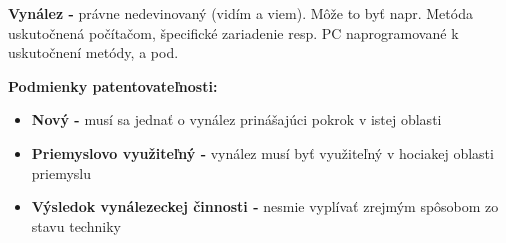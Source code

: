 \textbf{Vynález - } právne nedevinovaný (vidím a viem). Môže to byť napr. Metóda uskutočnená počítačom, špecifické zariadenie resp. PC naprogramované k uskutočnení metódy, a pod. 

\textbf{Podmienky patentovateľnosti:}
\begin{itemize}
    \item \textbf{Nový -} musí sa jednať o vynález prinášajúci pokrok v istej oblasti
    \item \textbf{Priemyslovo využiteľný -} vynález musí byť využiteľný v hociakej oblasti priemyslu
    \item \textbf{Výsledok vynálezeckej činnosti -} nesmie vyplívať zrejmým spôsobom zo stavu techniky
\end{itemize}
